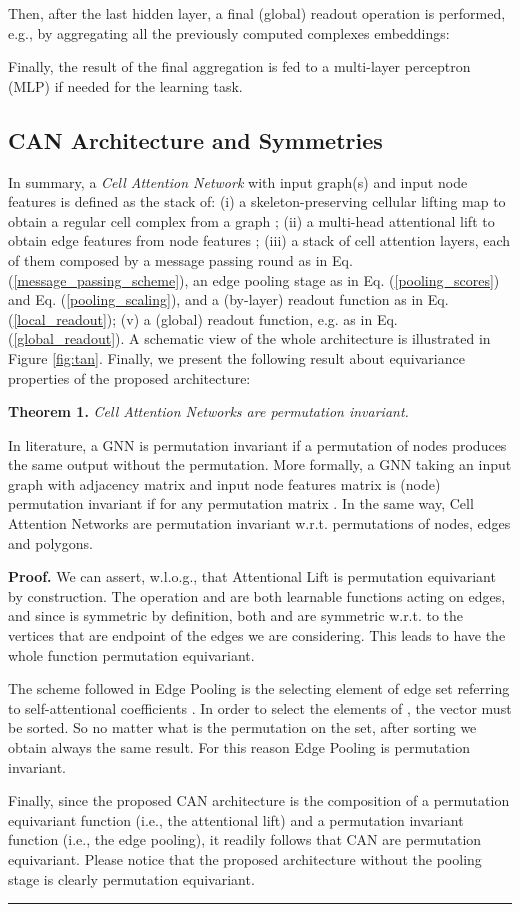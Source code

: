 \documentclass{article}
\newenvironment{proof}[1][Proof]{\noindent \textbf{#1.} }{\qedsymbol}
\newcommand{\qedsymbol}{\hspace{\fill}\rule{1.5ex}{1.5ex}}
\begin{document}
Then, after the last hidden layer, a final (global) readout operation is performed, e.g., by aggregating all the previously computed complexes embeddings: 

Finally, the result of the final aggregation is fed to a multi-layer perceptron (MLP) if needed for the learning task.



\subsection{CAN Architecture and Symmetries}
In summary, a \emph{Cell Attention Network} with input graph(s)  and input node features  is defined as the stack of: (i) a skeleton-preserving cellular lifting map to obtain a regular cell complex  from a graph ; (ii) a multi-head attentional lift to obtain edge features  from node features  ; (iii) a stack of  cell attention layers, each of them composed by a message passing round as in Eq. (\ref{message_passing_scheme}), an edge pooling stage as in Eq. (\ref{pooling_scores}) and Eq. (\ref{pooling_scaling}), and a (by-layer) readout function as in Eq. (\ref{local_readout}); (v) a (global) readout function, e.g. as in Eq. (\ref{global_readout}). A schematic view of the whole architecture is illustrated in Figure \ref{fig:tan}. Finally, we present the following result about equivariance properties of the proposed architecture:

\textbf{Theorem 1.} \textit{Cell Attention Networks are permutation invariant.}

In literature, a GNN is permutation invariant if a permutation of  nodes produces the same output without the permutation. More formally, a GNN  taking an input graph  with adjacency matrix  and input node features matrix  is (node) permutation invariant if  for any permutation matrix . In the same way, Cell Attention Networks are permutation invariant w.r.t. permutations of nodes, edges and polygons. 

\begin{proof}
We can assert, w.l.o.g., that Attentional Lift is permutation equivariant by construction. The operation  and  are both learnable functions acting on edges, and since  is symmetric by definition, both  and   are symmetric w.r.t. to the vertices that are endpoint of the edges we are considering. This leads to have the whole function permutation equivariant. 

The scheme followed in Edge Pooling is the selecting  element of edge set referring to self-attentional coefficients .
In order to select the  elements of , the vector  must be sorted. So no matter what is the permutation on the set, after sorting we obtain always the same result. For this reason Edge Pooling is permutation invariant. 

Finally, since the proposed CAN architecture is the composition of a permutation equivariant function (i.e., the attentional lift) and a permutation invariant function (i.e., the edge pooling), it readily follows that CAN are permutation equivariant. Please notice that the proposed architecture without the pooling stage is clearly permutation equivariant.
\end{proof}
\end{document}
